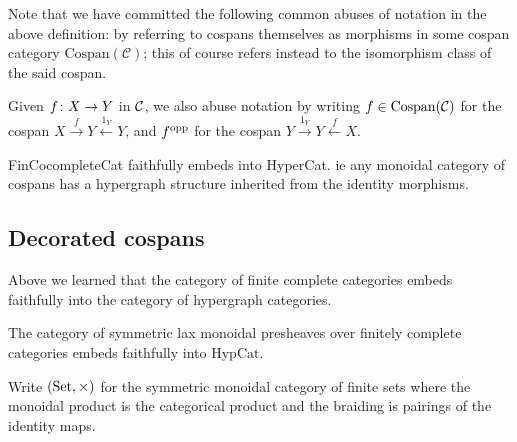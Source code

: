 \begin{notation}
Note that we have committed the following common abuses of notation in the above
definition: by referring to cospans themselves as
  morphisms in some cospan category $\mathrm{Cospan}(\mathcal C)$; this of
  course refers instead to the isomorphism class of the said cospan.

  Given $f {\colon} X \to Y$ in $\mathcal C$, we also abuse notation by writing $f \in
  \mathrm{Cospan}(\mathcal C)$ for the cospan $X \stackrel{f}\to Y
  \stackrel{1_Y}\leftarrow Y$, and $f^{\mathrm{opp}}$ for the cospan $Y \stackrel{1_Y}\to
  Y \stackrel{f}\leftarrow X$.
\end{notation}

FinCocompleteCat faithfully embeds into HyperCat. ie any monoidal category of
cospans has a hypergraph structure inherited from the identity morphisms.

\subsection{Decorated cospans}

Above we learned that the category of finite complete categories embeds
faithfully into the category of hypergraph categories.

\begin{theorem}
  The category of symmetric lax monoidal presheaves over finitely complete categories embeds
  faithfully into $\mathrm{HypCat}$.
\end{theorem}

Write $(\mathrm{Set},\times)$ for the
symmetric monoidal category of finite sets where the monoidal product is the
categorical product and the braiding is pairings of the identity maps.

